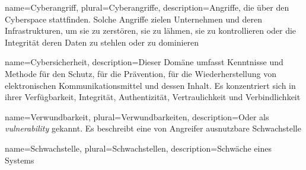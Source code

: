 
 {
    name={Cyberangriff},
    plural={Cyberangriffe},
    description={Angriffe, die über den Cyberspace stattfinden. Solche Angriffe zielen Unternehmen und deren Infrastrukturen, um sie zu zerstören, sie zu lähmen, sie zu kontrollieren oder die Integrität deren Daten zu stehlen oder zu dominieren \cite{NIST_Definitionen}}
}

 {
    name={Cybersicherheit},
    description={Dieser Domäne umfasst Kenntnisse und Methode für den Schutz, für die Prävention, für die Wiederherstellung von elektronischen Kommunikationsmittel und dessen Inhalt. Es konzentriert sich in ihrer Verfügbarkeit, Integrität, Authentizität, Vertraulichkeit und Verbindlichkeit \cite{NIST_Definitionen}}
}

 {
    name={Verwundbarkeit},
    plural={Verwundbarkeiten},
    description={Oder als \textit{vulnerability} gekannt. Es beschreibt eine von Angreifer ausnutzbare Schwachstelle \cite{Wendzel_It-Sicherheit}}
}

 {
    name={Schwachstelle},
    plural={Schwachstellen},
    description={Schwäche eines Systems \cite{Wendzel_It-Sicherheit}}
}

    